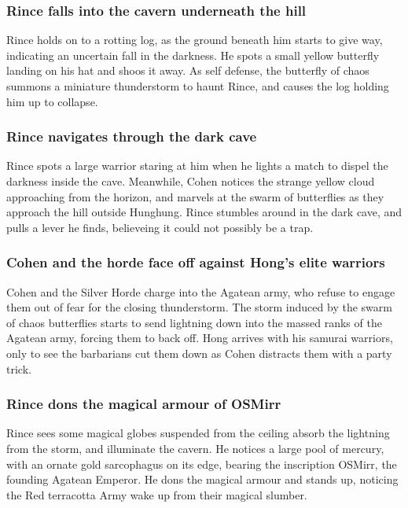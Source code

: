 \subsubsection{\Gls{Rince} falls into the cavern underneath the hill}
\Gls{Rince} holds on to a rotting log, as the ground beneath him starts to give way, indicating an
uncertain fall in the darkness. He spots a small yellow butterfly landing on his hat and shoos it
away. As self defense, the butterfly of chaos summons a miniature thunderstorm to haunt \Gls{Rince},
and causes the log holding him up to collapse.

\subsubsection{\Gls{Rince} navigates through the dark cave}
\Gls{Rince} spots a large warrior staring at him when he lights a match to dispel the darkness
inside the cave. Meanwhile, \Gls{Cohen} notices the strange yellow cloud approaching from the
horizon, and marvels at the swarm of butterflies as they approach the hill outside Hunghung.
\Gls{Rince} stumbles around in the dark cave, and pulls a lever he finds, believeing it could not
possibly be a trap.

\subsubsection{\Gls{Cohen} and the horde face off against \Gls{Hong}'s elite warriors}
\Gls{Cohen} and the Silver Horde charge into the Agatean army, who refuse to engage them out of
fear for the closing thunderstorm. The storm induced by the swarm of chaos butterflies starts to
send lightning down into the massed ranks of the Agatean army, forcing them to back off. \Gls{Hong}
arrives with his samurai warriors, only to see the barbarians cut them down as \Gls{Cohen}
distracts them with a party trick.

\subsubsection{\Gls{Rince} dons the magical armour of \Gls{OSMirr}}
\Gls{Rince} sees some magical globes suspended from the ceiling absorb the lightning from the storm,
and illuminate the cavern. He notices a large pool of mercury, with an ornate gold sarcophagus on
its edge, bearing the inscription \Gls{OSMirr}, the founding Agatean Emperor. He dons the magical
armour and stands up, noticing the Red terracotta Army wake up from their magical slumber.

